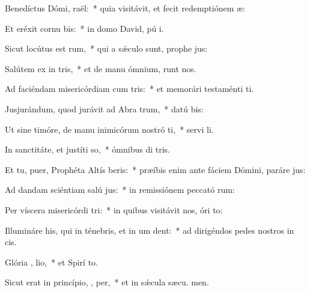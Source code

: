 \item Benedíctus Dómi,  raël:~* quia visitávit, et fecit redemptiónem  æ:
\item Et eréxit cornu  bis:~* in domo David, pú i.
\item Sicut locútus est   rum,~* qui a sǽculo sunt, prophe jus:
\item Salútem ex in tris,~* et de manu ómnium,  runt nos.
\item Ad faciéndam misericórdiam cum  tris:~* et memorári testaménti  ti.
\item Jusjurándum, quod jurávit ad Abra  trum,~* datú  bis:
\item Ut sine timóre, de manu inimicórum nostró ti,~* servi li.
\item In sanctitáte, et justíti  so,~* ómnibus di tris.
\item Et tu, puer, Prophéta Altís beris:~* præíbis enim ante fáciem Dómini, paráre  jus:
\item Ad dandam sciéntiam salú  jus:~* in remissiónem peccató rum:
\item Per víscera misericórdi  tri:~* in quibus visitávit nos, óri  to:
\item Illumináre his, qui in ténebris, et in um  dent:~* ad dirigéndos pedes nostros in  cis.
\item Glória ,  lio,~* et Spirí to.
\item Sicut erat in princípio,  ,  per,~* et in sǽcula sæcu. men.
